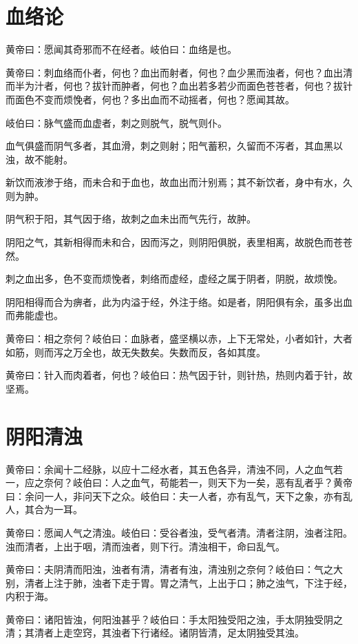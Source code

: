\documentclass[a4paper,12pt,UTF8,twoside]{ctexbook}
\begin{document}
	
	\chapter{血络论}
	
	黄帝曰：愿闻其奇邪而不在经者。岐伯曰：血络是也。
	
	黄帝曰：刺血络而仆者，何也？血出而射者，何也？血少黑而浊者，何也？血出清而半为汁者，何也？拔针而肿者，何也？血出若多若少而面色苍苍者，何也？拔针而面色不变而烦悗者，何也？多出血而不动摇者，何也？愿闻其故。
	
	岐伯曰：脉气盛而血虚者，刺之则脱气，脱气则仆。
	
	血气俱盛而阴气多者，其血滑，刺之则射；阳气蓄积，久留而不泻者，其血黑以浊，故不能射。
	
	新饮而液渗于络，而未合和于血也，故血出而汁别焉；其不新饮者，身中有水，久则为肿。
	
	阴气积于阳，其气因于络，故刺之血未出而气先行，故肿。
	
	阴阳之气，其新相得而未和合，因而泻之，则阴阳俱脱，表里相离，故脱色而苍苍然。
	
	刺之血出多，色不变而烦悗者，刺络而虚经，虚经之属于阴者，阴脱，故烦悗。
	
	阴阳相得而合为痹者，此为内溢于经，外注于络。如是者，阴阳俱有余，虽多出血而弗能虚也。
	
	黄帝曰：相之奈何？岐伯曰：血脉者，盛坚横以赤，上下无常处，小者如针，大者如筋，则而泻之万全也，故无失数矣。失数而反，各如其度。
	
	黄帝曰：针入而肉着者，何也？岐伯曰：热气因于针，则针热，热则内着于针，故坚焉。
	\chapter{阴阳清浊}
	
	黄帝曰：余闻十二经脉，以应十二经水者，其五色各异，清浊不同，人之血气若一，应之奈何？岐伯曰：人之血气，苟能若一，则天下为一矣，恶有乱者乎？黄帝曰：余问一人，非问天下之众。岐伯曰：夫一人者，亦有乱气，天下之象，亦有乱人，其合为一耳。
	
	黄帝曰：愿闻人气之清浊。岐伯曰：受谷者浊，受气者清。清者注阴，浊者注阳。浊而清者，上出于咽，清而浊者，则下行。清浊相干，命曰乱气。
	
	黄帝曰：夫阴清而阳浊，浊者有清，清者有浊，清浊别之奈何？岐伯曰：气之大别，清者上注于肺，浊者下走于胃。胃之清气，上出于口；肺之浊气，下注于经，内积于海。
	
	黄帝曰：诸阳皆浊，何阳浊甚乎？岐伯曰：手太阳独受阳之浊，手太阴独受阴之清；其清者上走空窍，其浊者下行诸经。诸阴皆清，足太阴独受其浊。
	
\end{document}
